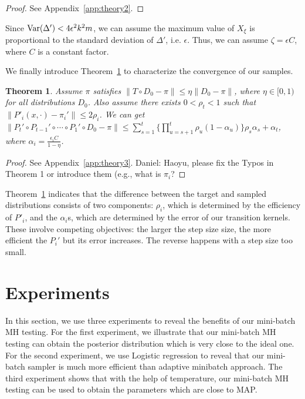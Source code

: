 \documentclass{article}
\newtheorem{theorem}{Theorem}
\begin{document}
\begin{proof}
See Appendix~\ref{app:theory2}.
\end{proof}

Since ${\rm Var}(\Delta') < 4\epsilon^2 k^2 m $, we can assume the maximum value of $X_{\xi}$ is
proportional to the standard deviation of $\Delta'$, i.e. $\epsilon$. Thus, we can assume
$\zeta=\epsilon C$, where $C$ is a constant factor.

We finally introduce Theorem~\ref{thm:theory3} to characterize the convergence of our samples.

\begin{theorem}\label{thm:theory3}
Assume $\pi$ satisfies $\|T \circ D_0 - \pi\| \leq \eta \|D_0 - \pi\|$, where $\eta \in [0, 1)$ for
all distributions $D_0$. Also assume there exists $0 < \rho_t < 1$ such that $\|P'_i(x, \cdot) -
\pi_i'\| \leq 2\rho_i$. We can get $\| P_t' \circ P_{t-1}' \circ \cdots \circ P_1' \circ D_0 - \pi
\| \leq \sum_{s=1}^t \{\prod _{u=s+1}^t \rho_u (1-\alpha_u)\} \rho_s \alpha_s + \alpha_t $, where
$\alpha_i = \frac{\epsilon_i C }{1-\eta}$.
\end{theorem}

\begin{proof}
See Appendix~\ref{app:theory3}. {\color{blue} Daniel: Haoyu, please fix the Typos in Theorem 1
or introduce them (e.g., what is $\pi_i$?}
\end{proof}

Theorem~\ref{thm:theory3} indicates that the difference between the target and sampled distributions
consists of two components: $\rho_i$, which is determined by the efficiency of $P'_i$, and the
$\alpha_i$s, which are determined by the error of our transition kernels. These involve competing
objectives: the larger the step size size, the more efficient the $P_i'$ but its error increases.
The reverse happens with a step size too small.




\section{Experiments}\label{sec:experiments}

In this section, we use three experiments to reveal the benefits of our mini-batch MH testing. For
the first experiment, we illustrate that our mini-batch MH testing can obtain the posterior
distribution which is very close to the ideal one. For the second experiment, we use Logistic
regression to reveal that our mini-batch sampler is much more efficient than adaptive minibatch
approach. The third experiment shows that with the help of temperature, our mini-batch MH testing
can be used to obtain the parameters which are close to MAP. 
\end{document}
